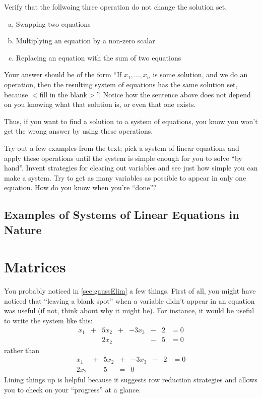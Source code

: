 \begin{Ex}
  \label{sec:gaussElimRules}
  Verify that the follwoing three operation do not change the solution set.  
  \begin{enumerate}[a)]
  \item Swapping two equations
  \item Multiplying an equation by a non-zero scalar
  \item Replacing an equation with the sum of two equations
  \end{enumerate}
  Your answer should be of the form ``If $x_1,...,x_n$ is some solution, and we do an operation, then the resulting system of equations has the same solution set, because $<$fill in the blank$>$''.  Notice how the sentence above does not depend on you knowing what that solution is, or even that one exists.  
\end{Ex}

Thus, if you want to find a solution to a system of equations, you know you won't get the wrong answer by using these operations.  
\begin{ImpEx}
  \label{sec:gaussElim}
  Try out a few examples from the text; pick a system of linear equations and apply these operations until the system is simple enough for you to solve ``by hand''.
  Invent strategies for clearing out variables and see just how simple you can make a system.
  Try to get as many variables as possible to appear in only one equation.
  How do you know when you're ``done''?
\end{ImpEx}


\subsection{Examples of Systems of Linear Equations in Nature}

\section{Matrices}

You probably noticed in \ref{sec:gaussElim} a few things.
First of all, you might have noticed that ``leaving a blank spot'' when a variable didn't appear in an equation was useful (if not, think about why it might be).  
For instance, it would be useful to write the system like this:
\[\begin{array}{ccccccccc}
  x_1 & + & 5x_2 & + & -3x_3 & - & 2 & = 0\\
   &  & 2x_2 & &  & - & 5 & = 0
\end{array}\]
rather than
\[\begin{array}{ccccccccc}
  x_1 & + & 5x_2 & + & -3x_3 & - & 2 & = 0\\
   2x_2 & -& 5 & = & 0
\end{array}\]
Lining things up is helpful because it suggests row reduction strategies and allows you to check on your ``progress'' at a glance.

